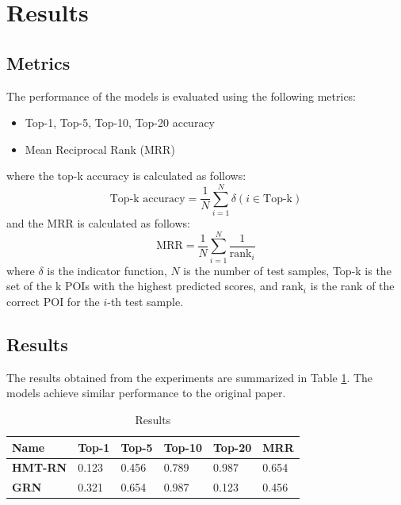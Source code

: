 \documentclass[twocolumn]{article}
\begin{document}
\section{Results}
\subsection{Metrics}
The performance of the models is evaluated using the following metrics:
\begin{itemize}
    \item Top-1, Top-5, Top-10, Top-20 accuracy
    \item Mean Reciprocal Rank (MRR)
\end{itemize}
where the top-k accuracy is calculated as follows:
\begin{equation}
    \text{Top-k accuracy} = \frac{1}{N} \sum_{i=1}^{N} \delta(i \in \text{Top-k})
\end{equation}
and the MRR is calculated as follows:
\begin{equation}
    \text{MRR} = \frac{1}{N} \sum_{i=1}^{N} \frac{1}{\text{rank}_i}
\end{equation}
where $\delta$ is the indicator function, $N$ is the number of test samples, Top-k is the set of the k
POIs with the highest predicted scores,
and $\text{rank}_i$ is the rank of the correct POI for the $i$-th test sample.
\subsection{Results}
The results obtained from the experiments are summarized in Table \ref{tab:results}.
The models achieve similar performance to the original paper.
\begin{table}
  \caption{Results}
   \centering
   \begin{tabular}{llllll}
     \toprule
      Name     & Top-1 & Top-5 & Top-10 & Top-20 & MRR \\
      \midrule
      \cmidrule(r){2-6}
      \textbf{HMT-RN}   & 0.123 & 0.456 & 0.789  & 0.987 & 0.654 \\
      \textbf{GRN}      & 0.321 & 0.654 & 0.987  & 0.123 & 0.456 \\

     \bottomrule
   \end{tabular}
   \label{tab:results}
 \end{table}
\end{document}
